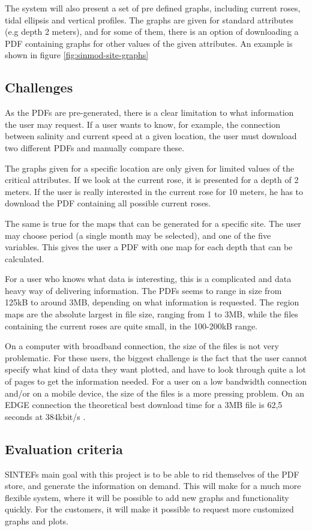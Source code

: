 \documentclass[11pt,a4paper,titlepage,oneside]{report}
\begin{document}
The system will also present a set of pre defined graphs, including current roses, tidal ellipsis and vertical profiles. The graphs are given for standard attributes (e.g depth 2 meters), and for some of them, there is an option of downloading a PDF containing graphs for other values of the given attributes. An example is shown in figure \ref{fig:sinmod-site-graphs}


\subsection{Challenges}
As the PDFs are pre-generated, there is a clear limitation to what information the user may request. If a user wants to know, for example, the connection between salinity and current speed at a given location, the user must download two different PDFs and manually compare these. 

The graphs given for a specific location are only given for limited values of the critical attributes. If we look at the current rose, it is presented for a depth of 2 meters. If the user is really interested in the current rose for 10 meters, he has to download the PDF containing all possible current roses. 

The same is true for the maps that can be generated for a specific site. The user may choose period (a single month may be selected), and one of the five variables. This gives the user a PDF with one map for each depth that can be calculated. 

For a user who knows what data is interesting, this is a complicated and data heavy way of delivering information. The PDFs seems to range in size from 125kB to around 3MB, depending on what information is requested. The region maps are the absolute largest in file size, ranging from 1 to 3MB, while the files containing the current roses are quite small, in the 100-200kB range. 

On a computer with broadband connection, the size of the files is not very problematic. For these users, the biggest challenge is the fact that the user cannot specify what kind of data they want plotted, and have to look through quite a lot of pages to get the information needed. For a user on a low bandwidth connection and/or on a mobile device, the size of the files is a more pressing problem. On an \gls{EDGE} connection the theoretical best download time for a 3MB file is 62,5 seconds at 384kbit/s \cite{3gpp.com}.

\subsection{Evaluation criteria}
SINTEFs main goal with this project is to be able to rid themselves of the PDF store, and generate the information on demand. This will make for a much more flexible system, where it will be possible to add new graphs and functionality quickly. For the customers, it will make it possible to request more customized graphs and plots.
\end{document}
